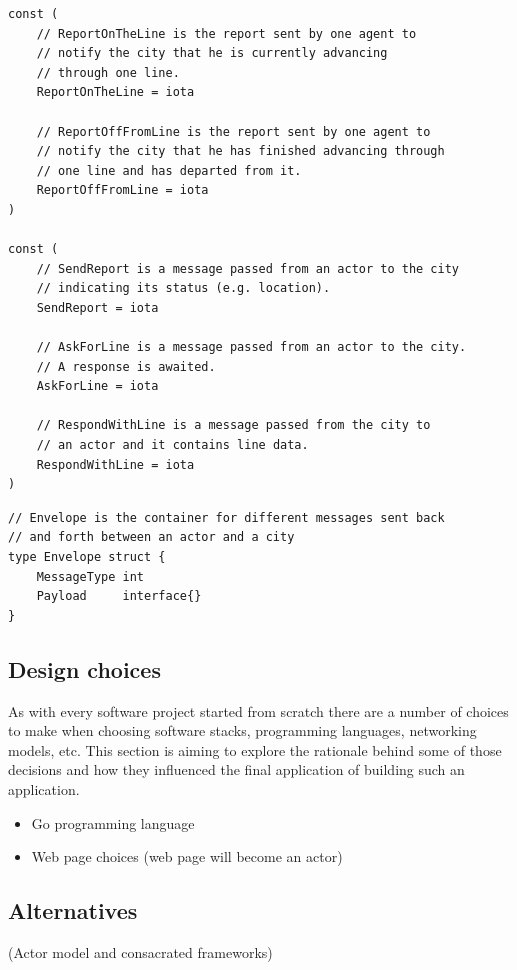 \documentclass[conference]{IEEEtran}
\begin{document}
\begin{lstlisting}[caption=Go enumerations for messaging, label=lst:goactorreports]
const (   
    // ReportOnTheLine is the report sent by one agent to
    // notify the city that he is currently advancing
    // through one line.
    ReportOnTheLine = iota
    
    // ReportOffFromLine is the report sent by one agent to
    // notify the city that he has finished advancing through
    // one line and has departed from it.
    ReportOffFromLine = iota
)
    
const (
    // SendReport is a message passed from an actor to the city
    // indicating its status (e.g. location).
    SendReport = iota
    
    // AskForLine is a message passed from an actor to the city.
    // A response is awaited.
    AskForLine = iota
    
    // RespondWithLine is a message passed from the city to
    // an actor and it contains line data.
    RespondWithLine = iota
)
\end{lstlisting}

\begin{lstlisting}[caption=Go top level struct (envelope), label=lst:goenvelope]
// Envelope is the container for different messages sent back
// and forth between an actor and a city
type Envelope struct {
    MessageType int
    Payload     interface{}
}
\end{lstlisting}

\subsection{Design choices}
\label{subsec:designchoices}

As with every software project started from scratch there are a number of choices to make when choosing software stacks, programming languages, networking models, etc. This section is aiming to explore the rationale behind some of those decisions and how they influenced the final application of building such an application.

\begin{itemize}
\item Go programming language
\item Web page choices (web page will become an actor)
\end{itemize}

\subsection{Alternatives}
(Actor model and consacrated frameworks)
\end{document}
